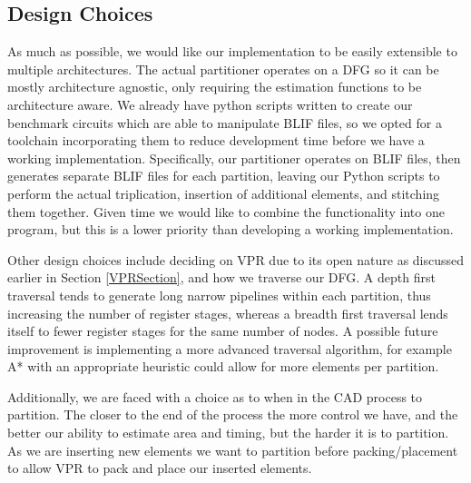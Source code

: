 \documentclass[12pt,final,oneside]{dwThesis} %
\begin{document}
\subsection{Design Choices}
As much as possible, we would like our implementation to be easily extensible to multiple architectures. The actual partitioner operates on a \ac{DFG} so it can be mostly architecture agnostic, only requiring the estimation functions to be architecture aware.
We already have python scripts written to create our benchmark circuits which are able to manipulate \ac{BLIF} files, so we opted for a toolchain incorporating them to reduce development time before we have a working implementation. Specifically, our partitioner operates on \ac{BLIF} files, then generates separate \ac{BLIF} files for each partition, leaving our Python scripts to perform the actual triplication, insertion of additional elements, and stitching them together. Given time we would like to combine the functionality into one program, but this is a lower priority than developing a working implementation.

Other design choices include deciding on \ac{VPR} due to its open nature as discussed earlier in Section \ref{VPRSection}, and how we traverse our \ac{DFG}. A depth first traversal tends to generate long narrow pipelines within each partition, thus increasing the number of register stages, whereas a breadth first traversal lends itself to fewer register stages for the same number of nodes. A possible future improvement is implementing a more advanced traversal algorithm, for example A* with an appropriate heuristic could allow for more elements per partition.

Additionally, we are faced with a choice as to when in the \ac{CAD} process to partition. The closer to the end of the process the more control we have, and the better our ability to estimate area and timing, but the harder it is to partition. As we are inserting new elements we want to partition before packing/placement to allow \ac{VPR} to pack and place our inserted elements.
\end{document}
